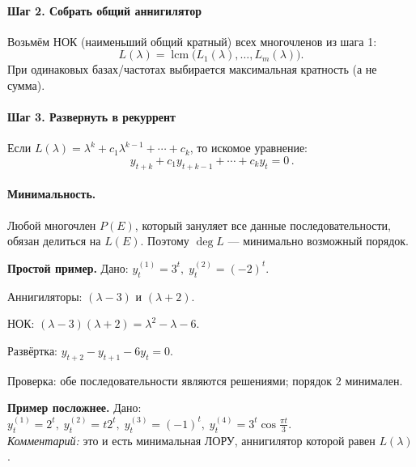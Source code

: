 \paragraph{Шаг 2. Собрать общий аннигилятор}
Возьмём НОК (наименьший общий кратный) всех многочленов из шага 1:
\[
 L(\lambda)=\operatorname{lcm}\big(L_1(\lambda),\ldots,L_m(\lambda)\big).
\]
При одинаковых базах/частотах выбирается максимальная кратность (а не сумма).

\paragraph{Шаг 3. Развернуть в рекуррент}
Если $L(\lambda)=\lambda^k+c_1\lambda^{k-1}+\cdots+c_k$, то искомое уравнение:
\[
 \boxed{\,y_{t+k}+c_1 y_{t+k-1}+\cdots+c_k y_t=0\,}.
\]

\paragraph{Минимальность.}
Любой многочлен $P(E)$, который зануляет все данные последовательности, обязан делиться на $L(E)$. Поэтому $\deg L$ — минимально возможный порядок.

\bigskip

\textbf{Простой пример.} Дано: $y_t^{(1)}=3^t,\; y_t^{(2)}=(-2)^t$. \\
\begin{HSESteps}
  \item Аннигиляторы: $(\lambda-3)$ и $(\lambda+2)$.
  \item НОК: $(\lambda-3)(\lambda+2)=\lambda^2-\lambda-6$.
  \item Развёртка: $\boxed{y_{t+2}-y_{t+1}-6y_t=0}$.
\end{HSESteps}
Проверка: обе последовательности являются решениями; порядок $2$ минимален.

\bigskip

\textbf{Пример посложнее.} Дано: $y^{(1)}_t=2^t,\; y^{(2)}_t=t2^t,\; y^{(3)}_t=(-1)^t,\; y^{(4)}_t=3^t\cos\tfrac{\pi t}{3}$. \\
\textit{Комментарий:} это и есть минимальная ЛОРУ, аннигилятор которой равен $L(\lambda)$.

